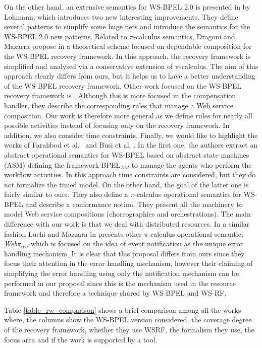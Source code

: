On the other hand, an extensive semantics for WS-BPEL 2.0
is presented in \cite{Lohmann07} by Lohmann, which introduces two new interesting improvements. They define several patterns to simplify some huge nets and introduce the semantics for the WS-BPEL 2.0 new patterns. Related to $\pi$-calculus semantics, Dragoni and Mazarra
propose in \cite{DragoniM09} a theoretical scheme focused on dependable composition for the  WS-BPEL recovery
framework. In this approach, the recovery framework is simplified
and analysed via a conservative extension of $\pi$-calculus. The
aim of this approach clearly differs from ours, but it helps us to have
a better understanding of the WS-BPEL recovery framework. Other work focused on the WS-BPEL
recovery framework is \cite{Qiu05}. Although this is more focused in the compensation handler, they describe the corresponding rules
that manage a Web service composition. Our work is therefore more general as we define rules for nearly all possible activities instead of focusing only on the recovery framework. In addition, we also consider time constraints. Finally, we would like to highlight the works of Farahbod et al.~\cite{Farahbod05} and Busi et al. \cite{Busi05}. In the first one, the authors extract an abstract operational semantics for WS-BPEL based on abstract state machines (ASM) defining the framework BPEL$_{AM}$ to manage the agents who perform the workflow activities. In this approach time constraints are considered, but they do not formalize the timed model. On the other hand, the goal of the latter one is fairly similar to ours. They also define a $\pi$-calculus operational semantics for WS-BPEL and describe a conformance notion. They present all the machinery to model Web service compositions (choreographies and orchestrations). The main difference with our work is that we deal with distributed resources. In a similar fashion Luchi and Mazzara in \cite{LucchiM07} presents other $\pi$-calculus operational semantic, \textit{Web}$\pi_{\infty}$, which is focused on the idea of event notification as the unique error handling mechanism. It is clear that this proposal differs from ours since they focus their attention in the error handling mechanism, however their claiming of simplifying the error handling using only the notification mechanism can be performed in our proposal since this is the mechanism used in the resource framework and therefore a technique shared by WS-BPEL and WS-RF.

Table \ref{table_rw_comparison} shows a brief comparison among all the works where, the columns show the WS-BPEL version considered, the coverage degree of the recovery framework, whether they use WSRF, the formalism they use, the focus area and if the work is supported by a tool.

